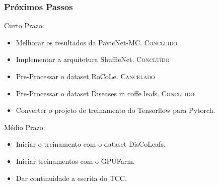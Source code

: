 \documentclass[aspectratio=169]{beamer}
\begin{document}
\begin{frame}
\begin{columns}
    \end{columns}

\end{frame}

























\begin{frame}
    \frametitle{Próximos Passos}

    \begin{block}{Curto Prazo:}

        \begin{itemize}
            \item Melhorar os resultados da PavicNet-MC. \textsc{Concluído}
            \item Implementar a arquitetura ShuffleNet. \textsc{Concluído}
            \item Pre-Processar o dataset RoCoLe. \textsc{Cancelado}
            \item Pre-Processar o dataset Diseases in coffe leafs. \textsc{Concluído}
            \item \color{blue} Converter o projeto de treinamento do Tensorflow para Pytorch.
        \end{itemize}

    \end{block}



    \begin{block}{Médio Prazo:}

        \begin{itemize}
            \item \color{blue} Iniciar o treinamento com o dataset DisCoLeafs.
            \item \color{blue} Iniciar treinamentos com o GPUFarm.
            \item \color{blue} Dar continuidade a escrita do TCC.
        \end{itemize}

    \end{block}




\end{frame}
\end{document}
